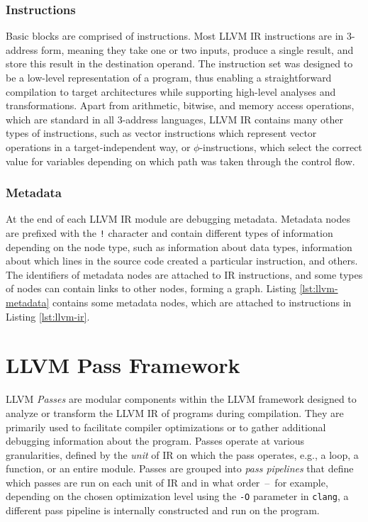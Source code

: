 \subsubsection{Instructions}
Basic blocks are comprised of instructions. Most LLVM IR instructions are in 3-address form, meaning they take one or two inputs, produce a single result, and store this result in the destination operand. The instruction set was designed to be a low-level representation of a program, thus enabling a straightforward compilation to target architectures while supporting high-level analyses and transformations. Apart from arithmetic, bitwise, and memory access operations, which are standard in all 3-address languages, LLVM IR contains many other types of instructions, such as vector instructions which represent vector operations in a target-independent way, or $\phi$-instructions, which select the correct value for variables depending on which path was taken through the control flow. \cite{llvm-ir-set}



\subsubsection{Metadata}

At the end of each LLVM IR module are debugging metadata. Metadata nodes are prefixed with the \texttt{!} character and contain different types of information depending on the node type, such as information about data types, information about which lines in the source code created a particular instruction, and others. The identifiers of metadata nodes are attached to IR instructions, and some types of nodes can contain links to other nodes, forming a graph. Listing \ref{lst:llvm-metadata} contains some metadata nodes, which are attached to instructions in Listing \ref{lst:llvm-ir}.


\section{LLVM Pass Framework}

LLVM \emph{Passes} are modular components within the LLVM framework designed to analyze or transform the LLVM IR of programs during compilation. They are primarily used to facilitate compiler optimizations or to gather additional debugging information about the program. Passes operate at various granularities, defined by the \emph{unit} of IR on which the pass operates, e.g., a loop, a function, or an entire module. Passes are grouped into \emph{pass pipelines} that define which passes are run on each unit of IR and in what order \,--\, for example, depending on the chosen optimization level using the \verb|-O| parameter in \texttt{clang}, a different pass pipeline is internally constructed and run on the program.

